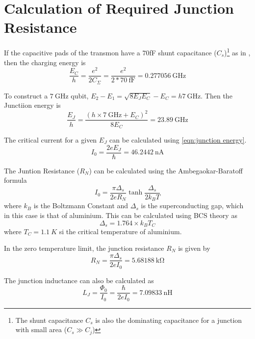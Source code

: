 
\chapter{Calculation of Required Junction Resistance} %

\label{AppendixA} %

If the capacitive pads of the transmon have a $70$fF shunt capacitance ($C_s$)\footnote{The shunt capacitance $C_s$ is also the dominating capacitance for a junction with small area ($C_s\gg C_j$)} as in \cite{Paik2011}, then the charging energy is
\begin{equation}
\frac{E_C}{h} = \frac{e^2}{2C_\Sigma}= \frac{e^2}{2*\SI{70}{\femto \farad}} = \SI{0.277056}{\giga\hertz}
\end{equation}

To construct a $\SI{7}{\giga\hertz}$ qubit, $E_2-E_1 = \sqrt{8E_JE_C}-E_C = h\SI{7}{\giga\hertz}$. Then the Junctiion energy is
\begin{equation}
\frac{E_J}{h} = \frac{(h\times\SI{7}{\giga\hertz}+E_C)^2}{8E_C} = \SI{23.89}{\giga\hertz}
\end{equation}

The critical current for a given $E_J$ can be calculated using \ref{eqn:junction energy}.
\begin{equation}
I_0 = \frac{2eE_J}{\hbar} = \SI{46.2442}{\nano\ampere}
\end{equation}

The Juntion Resistance ($R_N$) can be calculated using the Ambegaokar-Baratoff formula
\begin{equation}
I_0 = \frac{\pi\Delta_s}{2eR_N}\tanh\frac{\Delta_s}{2k_BT}
\end{equation}
where $k_B$ is the Boltzmann Constant and $\Delta_s$ is the superconducting gap, which in this case is that of aluminium. This can be calculated using BCS theory as
\begin{equation}
\Delta_s = 1.764\times k_BT_C
\end{equation}
where $T_C = \SI{1.1}{K}$ si the critical temperature of aluminium.

In the zero temperature limit, the junction resistance $R_N$ is given by
\begin{equation}
R_N = \frac{\pi\Delta_s}{2eI_0} = \SI{5.68188}{\kilo\ohm}
\end{equation}

The junction inductance can also be calculated as
\begin{equation}
L_J = \frac{\Phi_0}{I_0} = \frac{\hbar}{2eI_0} = \SI{7.09833}{\nano\henry}
\end{equation}
